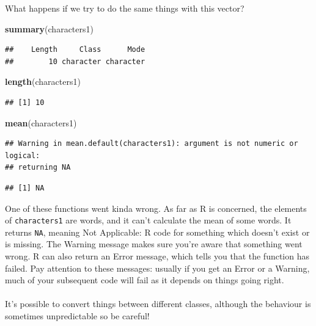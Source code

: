 \documentclass[
]{book}
\newenvironment{Shaded}{\begin{snugshade}}{\end{snugshade}}
\newcommand{\KeywordTok}[1]{\textcolor[rgb]{0.13,0.29,0.53}{\textbf{#1}}}
\newcommand{\NormalTok}[1]{#1}
\begin{document}
What happens if we try to do the same things with this vector?

\begin{Shaded}
\begin{Highlighting}[]
\KeywordTok{summary}\NormalTok{(characters1)}
\end{Highlighting}
\end{Shaded}

\begin{verbatim}
##    Length     Class      Mode 
##        10 character character
\end{verbatim}

\begin{Shaded}
\begin{Highlighting}[]
\KeywordTok{length}\NormalTok{(characters1)}
\end{Highlighting}
\end{Shaded}

\begin{verbatim}
## [1] 10
\end{verbatim}

\begin{Shaded}
\begin{Highlighting}[]
\KeywordTok{mean}\NormalTok{(characters1)}
\end{Highlighting}
\end{Shaded}

\begin{verbatim}
## Warning in mean.default(characters1): argument is not numeric or logical:
## returning NA
\end{verbatim}

\begin{verbatim}
## [1] NA
\end{verbatim}

One of these functions went kinda wrong. As far as R is concerned, the
elements of \texttt{characters1} are words, and it can't calculate the mean of some
words. It returns \texttt{NA}, meaning Not Applicable: R code for something which
doesn't exist or is missing. The Warning message makes sure you're aware that
something went wrong. R can also return an Error message, which tells you that
the function has failed. Pay attention to these messages: usually if you get
an Error or a Warning, much of your subsequent code will fail as it depends
on things going right.\\
~\\

It's possible to convert things between different classes, although the
behaviour is sometimes unpredictable so be careful!
\end{document}
